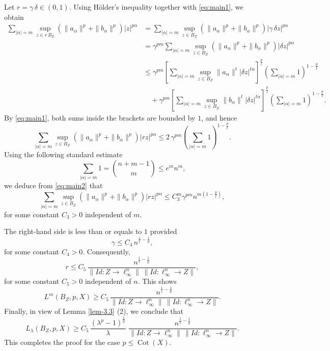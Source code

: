 \documentclass[a4paper,11pt, reqno]{amsart}
\theoremstyle{definition}
\begin{document}
Let $r=\gamma \, \delta \in(0,1)$. Using H\"{o}lder's inequality together with \eqref{eq:main1}, we obtain
\begin{align*}
	\sum_{|\alpha|=m}\sup_{z\in r \, B_Z}\left(\|a_\alpha\|^p+\|b_\alpha\|^p\right)|z|^{p\alpha}
	&=\sum_{|\alpha|=m}\sup_{z\in B_Z}\left(\|a_\alpha\|^p+\|b_\alpha\|^p\right)|\gamma \, \delta z|^{p\alpha}\\
	&= \gamma^{pm}\sum_{|\alpha|=m}\sup_{z\in B_Z}\left(\|a_\alpha\|^p+\|b_\alpha\|^p\right)|\delta z|^{p\alpha}\\
	&\leq \gamma^{pm}\left[\sum_{|\alpha|=m}\sup_{z\in B_Z}\|a_\alpha\|^t|\delta z|^{t\alpha}\right]^{\frac{p}{t}}
	\left(\sum_{|\alpha|=m}1\right)^{1-\frac{p}{t}}\\
	&\quad + \gamma^{pm}\left[\sum_{|\alpha|=m}\sup_{z\in B_Z}\|b_\alpha\|^t|\delta z|^{t\alpha}\right]^{\frac{p}{t}}
	\left(\sum_{|\alpha|=m}1\right)^{1-\frac{p}{t}}.
\end{align*}
By \eqref{eq:main1}, both sums inside the brackets are bounded by $1$, and hence
\begin{equation}\label{eq:main2}
	\sum_{|\alpha|=m}\sup_{z\in B_Z}\left(\|a_\alpha\|^p+\|b_\alpha\|^p\right)|rz|^{p\alpha}
	\leq 2\, \gamma^{pm}\left(\sum_{|\alpha|=m}1\right)^{1-\frac{p}{t}}.
\end{equation}
Using the following standard estimate
\[
\sum_{|\alpha|=m}1=\binom{n+m-1}{m}\leq e^m n^m,
\]
we deduce from \eqref{eq:main2} that
\[
\sum_{|\alpha|=m}\sup_{z\in B_Z}\left(\|a_\alpha\|^p+\|b_\alpha\|^p\right)|rz|^{p\alpha}
\leq C_3^m \gamma^{pm} n^{m\left(1-\frac{p}{t}\right)},
\]
for some constant $C_3>0$ independent of $m$.

The right-hand side is less than or equals to $1$ provided
\[
\gamma\leq C_4 \, n^{\frac{1}{t}-\frac{1}{p}},
\]
for some constant $C_4>0$. Consequently,
\[
r\leq C_5 \, \frac{ n^{\frac{1}{t}-\frac{1}{p}}}{\|Id: Z\to \ell_\infty^n\|\,\|Id:\ell_\infty^n\to Z\|},
\]
for some constant $C_5>0$ independent of $n$. This shows
\[
L^m(B_{Z}, p,X)\geq C_5 \, \frac{ n^{\frac{1}{t}-\frac{1}{p}}}{\|Id: Z\to \ell_\infty^n\|\,\|Id:\ell_\infty^n\to Z\|}.
\]
Finally, in view of Lemma \ref{lem-3.3} (2), we conclude that
\begin{equation*}
	L_{\lambda}(B_{Z}, p,X) \geq C_5 \, \dfrac{\left(\lambda^p -1\right)^{\frac{1}{p}}}{\lambda}\,  \, \frac{ n^{\frac{1}{t}-\frac{1}{p}}}{\|Id: Z\to \ell_\infty^n\|\,\|Id:\ell_\infty^n\to Z\|}.
\end{equation*}
This completes the proof for the case $p\leq \operatorname{Cot}(X)$.
\end{document}
